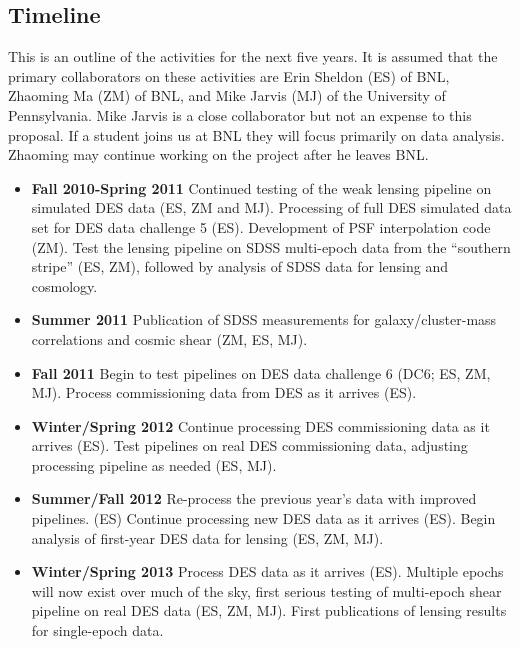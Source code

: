 \documentclass[12pt]{article}
\begin{document}
\clearpage
\newpage
\subsection{Timeline}

This is an outline of the activities for the next five years.  It is assumed
that the primary collaborators on these activities are Erin Sheldon (ES) of
BNL, Zhaoming Ma (ZM) of BNL, and Mike Jarvis (MJ) of the University of
Pennsylvania.  Mike Jarvis is a close collaborator but not an expense to this
proposal. If a student joins us at BNL they will focus primarily on data
analysis.  Zhaoming may continue working on the project after he leaves BNL.

\begin{itemize}

\item {\bf Fall 2010-Spring 2011} Continued testing of the weak lensing
pipeline on simulated DES data (ES, ZM and MJ).  Processing of full DES
simulated data set for DES data challenge 5 (ES).     Development of PSF
interpolation code (ZM).  Test the lensing pipeline on SDSS multi-epoch data
from the ``southern stripe'' (ES, ZM), followed by analysis of SDSS data for
lensing and cosmology.

\item {\bf Summer 2011} Publication of SDSS measurements for
galaxy/cluster-mass correlations and cosmic shear (ZM, ES, MJ).

\item {\bf Fall 2011} Begin to test pipelines on DES data challenge 6 (DC6; ES,
ZM, MJ).  Process commissioning data from DES as it arrives (ES).

\item {\bf Winter/Spring 2012} Continue processing DES commissioning data as it
arrives (ES).  Test pipelines on real DES commissioning data, adjusting
processing pipeline as needed (ES, MJ).

\item {\bf Summer/Fall 2012 } Re-process the previous year's data with improved
pipelines. (ES)   Continue processing new DES data as it arrives (ES). Begin
analysis of first-year DES data for lensing (ES, ZM, MJ).

\item {\bf Winter/Spring 2013} Process DES data as it arrives (ES). Multiple
epochs will now exist over much of the sky, first serious testing of
multi-epoch shear pipeline on real DES data (ES, ZM, MJ).  First publications
of lensing results for single-epoch data.


\end{itemize}
\end{document}
